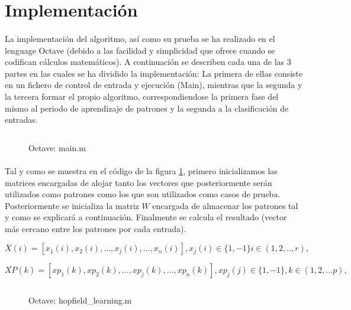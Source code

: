 \documentclass[10pt, a4paper,spanish]{article}
\begin{document}
	\section{Implementación}

		\paragraph{}
		La implementación del algoritmo, así como su prueba se ha realizado en el lenguage Octave (debido a las facilidad y simplicidad que ofrece cuando se codifican cálculos matemáticos). A continuación se describen cada una de las 3 partes en las cuales se ha dividido la implementación: La primera de ellas consiste en un fichero de control de entrada y ejecución (Main), mientras que la segunda y la tercera formar el propio algoritmo, correspondiendose la primera fase del mismo al periodo de aprendizaje de patrones y la segunda a la clasificación de entradas.

		\begin{figure}[H]
			\centering
			\inputminted{octave}{../src/main.m}
			\caption{Octave: main.m}
			\label{code:main}
		\end{figure}

		\paragraph{}
		Tal y como se muestra en el código de la figura \ref{code:main}, primero inicializamos las matrices encargadas de alojar tanto los vectores que posteriormente serán utilizados como patrones como los que son utilizados como casos de prueba. Posteriormente se inicializa la matriz $W$ encargada de almacenar los patrones tal y como se explicará a continuación. Finalmente se calcula el resultado (vector más cercano entre los patrones por cada entrada).

		\begin{equation}
		\overline{X}(i) = [x_1(i), x_2(i), ..., x_j(i), ..., x_n(i)], x_j(i) \in \{1,-1\} i \in (1,2,.., r),
		\end{equation}

		\begin{equation}
			\overline{XP}(k) = [xp_1(k), xp_2(k), ..., xp_j(k), ..., xp_n(k)], xp_j(j) \in \{1,-1\}, k \in (1,2,...p),
		\end{equation}

		\begin{figure}[H]
			\centering
			\inputminted{octave}{../src/hopfield_learning.m}
			\caption{Octave: hopfield\_learning.m}
			\label{code:learning}
		\end{figure}
\end{document}
